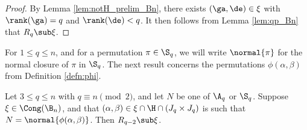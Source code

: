 \begin{proof} By Lemma \ref{lem:notH_prelim_Bn}, there exists $(\ga,\de)\in\xi$ with $\rank(\ga)=q$ and $\rank(\de)<q$.  It then follows from Lemma \ref{lem:qp_Bn} that $R_q\sub\xi$. \end{proof}


For $1\leq q\leq n$, and for a permutation $\pi\in\S_q$, we will write $\normal{\pi}$ for the normal closure of $\pi$ in $\S_q$.  The next result concerns the permutations $\phi(\alpha,\beta)$ from Definition \ref{defn:phi}.


\begin{lemma}\label{lem:thN_Bn}
Let $3\leq q\leq n$ with $q\equiv n\pmod 2$, and let $N$ be one of $\A_q$ or
  $\S_q$.  Suppose $\xi\in\Cong(\B_n)$, and that $(\alpha,\beta)\in \xi\cap{\H}\cap (J_q\times J_q)$ is such that $N=\normal{\phi(\alpha,\beta)}$.  Then $R_{q-2}\sub\xi$.
\end{lemma}

